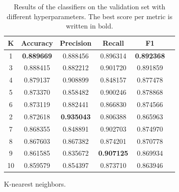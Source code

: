 \begin{appendices}
\begin{table}[ht]
\bigskip
\begin{subtable}{\textwidth}
\begin{adjustbox}{minipage=18cm, center}
\centering
\begin{tabular*}{\textwidth}{c @{\extracolsep{\fill}} ccccc}
\toprule
K &  Accuracy &  Precision &    Recall &        F1 \\
\midrule
1  &  \textbf{0.889669} &   0.888456 &  0.896314 &  \textbf{0.892368} \\
3  &  0.888415 &   0.882212 &  0.901720 &  0.891859 \\
4  &  0.879137 &   0.908899 &  0.848157 &  0.877478 \\
5  &  0.873370 &   0.858482 &  0.900246 &  0.878868 \\
6  &  0.873119 &   0.882441 &  0.866830 &  0.874566 \\
2  &  0.872618 &   \textbf{0.935043} &  0.806388 &  0.865963 \\
7  &  0.868355 &   0.848891 &  0.902703 &  0.874970 \\
8  &  0.867603 &   0.867382 &  0.874201 &  0.870778 \\
9  &  0.861585 &   0.835672 &  \textbf{0.907125} &  0.869934 \\
10 &  0.859579 &   0.854397 &  0.873710 &  0.863946 \\
\bottomrule
\end{tabular*}
\caption{K-nearest neighbors.}\label{tab:sub_first}

\end{adjustbox}
\end{subtable}
\caption{Results of the classifiers on the validation set with different hyperparameters. The best score per metric is written in bold.} 
\label{appendix:Hyperparameters}

\end{table}

\end{appendices}






